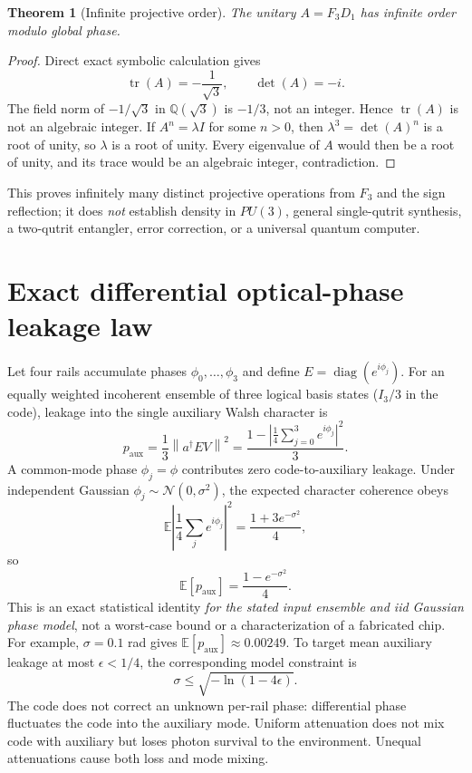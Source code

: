 \documentclass[10pt]{article}
\newtheorem{theorem}{Theorem}
\begin{document}
\begin{theorem}[Infinite projective order]
The unitary $A=F_3D_1$ has infinite order modulo
global phase.
\end{theorem}
\begin{proof}
Direct exact symbolic calculation gives
\[
 \operatorname{tr}(A)=-\frac1{\sqrt3},\qquad
 \det(A)=-i.
\]
The field norm of $-1/\sqrt3$ in $\mathbb Q(\sqrt3)$ is
$-1/3$, not an integer. Hence $\operatorname{tr}(A)$
is not an algebraic integer. If $A^n=\lambda I$
for some $n>0$, then $\lambda^3=\det(A)^n$
is a root of unity, so $\lambda$ is a root of unity.
Every eigenvalue of $A$ would then be a root of unity,
and its trace would be an algebraic integer, contradiction.
\end{proof}
This proves infinitely many distinct projective operations
from $F_3$ and the sign reflection; it does \emph{not}
establish density in $PU(3)$, general single-qutrit
synthesis, a two-qutrit entangler, error correction,
or a universal quantum computer.

\section{Exact differential optical-phase leakage law}
Let four rails accumulate phases
$\phi_0,\ldots,\phi_3$ and define
$E=\operatorname{diag}(e^{i\phi_j})$. For an
equally weighted incoherent ensemble of three logical
basis states ($I_3/3$ in the code), leakage into the
single auxiliary Walsh character is
\[
 p_{\mathrm{aux}}=
 \frac13\left\|a^\dagger EV\right\|^2
 =\frac{1-\left|\frac14\sum_{j=0}^3
 e^{i\phi_j}\right|^2}{3}.
\]
A common-mode phase $\phi_j=\phi$ contributes zero
code-to-auxiliary leakage. Under independent Gaussian
$\phi_j\sim\mathcal N(0,\sigma^2)$, the expected
character coherence obeys
\[
 \mathbb E\left|\frac14\sum_j e^{i\phi_j}\right|^2
 =\frac{1+3e^{-\sigma^2}}4,
\]
so
\begin{equation}
 \boxed{\mathbb E[p_{\mathrm{aux}}]
 =\frac{1-e^{-\sigma^2}}4.}
 \label{eq:noise}
\end{equation}
This is an exact statistical identity \emph{for the
stated input ensemble and iid Gaussian phase model},
not a worst-case bound or a characterization of
a fabricated chip. For example, $\sigma=0.1$ rad gives
$\mathbb E[p_{\mathrm{aux}}]\approx0.00249$.
To target mean auxiliary leakage at most $\epsilon<1/4$,
the corresponding model constraint is
\[
 \sigma\le\sqrt{-\ln(1-4\epsilon)}.
\]
The code does not correct an unknown per-rail phase:
differential phase fluctuates the code into the auxiliary
mode. Uniform attenuation does not mix code with auxiliary
but loses photon survival to the environment.
Unequal attenuations cause both loss and mode mixing.
\end{document}
